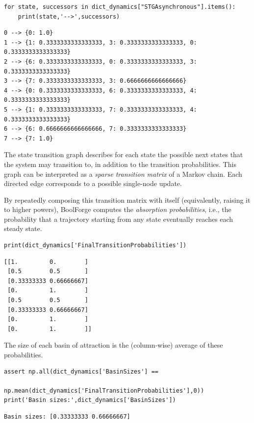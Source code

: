 \documentclass[
]{article}
\begin{document}
\begin{lstlisting}
for state, successors in dict_dynamics["STGAsynchronous"].items():
    print(state,'-->',successors)
\end{lstlisting}

\begin{lstlisting}
0 --> {0: 1.0}
1 --> {1: 0.3333333333333333, 3: 0.3333333333333333, 0: 0.3333333333333333}
2 --> {6: 0.3333333333333333, 0: 0.3333333333333333, 3: 0.3333333333333333}
3 --> {7: 0.3333333333333333, 3: 0.6666666666666666}
4 --> {0: 0.3333333333333333, 6: 0.3333333333333333, 4: 0.3333333333333333}
5 --> {1: 0.3333333333333333, 7: 0.3333333333333333, 4: 0.3333333333333333}
6 --> {6: 0.6666666666666666, 7: 0.3333333333333333}
7 --> {7: 1.0}
\end{lstlisting}

The state transition graph describes for each state the possible next
states that the system may transition to, in addition to the transition
probabilities. This graph can be interpreted as a \emph{sparse
transition matrix} of a Markov chain. Each directed edge corresponds to
a possible single-node update.

By repeatedly composing this transition matrix with itself
(equivalently, raising it to higher powers), BoolForge computes the
\emph{absorption probabilities}, i.e., the probability that a trajectory
starting from any state eventually reaches each steady state.

\begin{lstlisting}
print(dict_dynamics['FinalTransitionProbabilities'])
\end{lstlisting}

\begin{lstlisting}
[[1.         0.        ]
 [0.5        0.5       ]
 [0.33333333 0.66666667]
 [0.         1.        ]
 [0.5        0.5       ]
 [0.33333333 0.66666667]
 [0.         1.        ]
 [0.         1.        ]]
\end{lstlisting}

The size of each basin of attraction is the (column-wise) average of
these probabilities.

\begin{lstlisting}
assert np.all(dict_dynamics['BasinSizes'] == 
              np.mean(dict_dynamics['FinalTransitionProbabilities'],0))
print('Basin sizes:',dict_dynamics['BasinSizes'])
\end{lstlisting}

\begin{lstlisting}
Basin sizes: [0.33333333 0.66666667]
\end{lstlisting}
\end{document}
